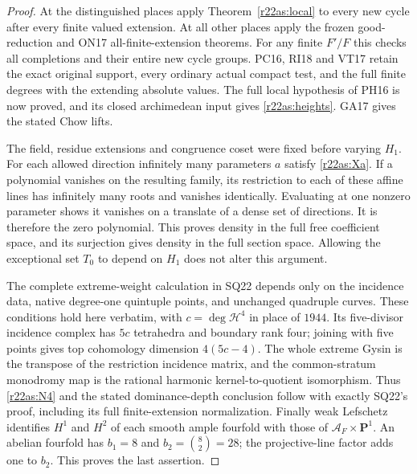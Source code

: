 \begin{proof}
At the distinguished places apply
Theorem~\ref{r22as:local} to every new cycle
after every finite valued extension.  At
all other places apply the frozen good-
reduction and ON17 all-finite-extension
theorems.  For any finite $F'/F$ this checks
all completions and their entire new cycle
groups.  PC16, RI18 and VT17 retain the
exact original support, every ordinary
actual compact test, and the full finite
degrees with the extending absolute values.
The full local hypothesis of PH16 is now
proved, and its closed archimedean input
gives \eqref{r22as:heights}.  GA17 gives
the stated Chow lifts.

The field, residue extensions and congruence
coset were fixed before varying $H_1$.
For each allowed direction infinitely many
parameters $a$ satisfy \eqref{r22as:Xa}.
If a polynomial vanishes on the resulting
family, its restriction to each of these
affine lines has infinitely many roots and
vanishes identically.  Evaluating at one
nonzero parameter shows it vanishes on a
translate of a dense set of directions.
It is therefore the zero polynomial.
This proves density in the full free
coefficient space, and its surjection
gives density in the full section space.
Allowing the exceptional set $T_0$ to
depend on $H_1$ does not alter this
argument.

The complete extreme-weight calculation
in SQ22 depends only on the incidence
data, native degree-one quintuple points,
and unchanged quadruple curves.  These
conditions hold here verbatim, with
$c=\deg\mathcal H^4$ in place of $1944$.
Its five-divisor incidence complex has
$5c$ tetrahedra and boundary rank four;
joining with five points gives top
cohomology dimension $4(5c-4)$.
The whole extreme Gysin is the transpose
of the restriction incidence matrix,
and the common-stratum monodromy map is
the rational harmonic kernel-to-quotient
isomorphism.  Thus \eqref{r22as:N4}
and the stated dominance-depth conclusion
follow with exactly SQ22's proof, including
its full finite-extension normalization.
Finally weak Lefschetz identifies $H^1$
and $H^2$ of each smooth ample fourfold
with those of $\mathcal A_F\times\mathbf P^1$.
An abelian fourfold has $b_1=8$ and
$b_2=\binom82=28$; the projective-line
factor adds one to $b_2$.  This proves
the last assertion.
\end{proof}

